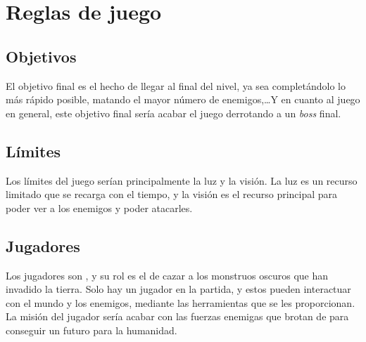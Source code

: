\section{Reglas de juego}
    \begin{multicols}{2}

        \subsection{Objetivos}
        El objetivo final es el hecho de llegar al final del nivel, ya sea completándolo lo más rápido posible, matando el mayor número de enemigos,\dots\space Y en cuanto al juego en general, este objetivo final sería acabar el juego derrotando a un \textit{boss} final.
        \subsection{Límites}
        Los límites del juego serían principalmente la luz y la visión. La luz es un recurso limitado que se recarga con el tiempo, y la visión es el recurso principal para poder ver a los enemigos y poder atacarles.

        \subsection{Jugadores}
        Los jugadores son \hunters, y su rol es el de cazar a los monstruos oscuros que han invadido la tierra. Solo hay un jugador en la partida, y estos pueden interactuar con el mundo y los enemigos, mediante las herramientas que se les proporcionan.
        La misión del jugador sería acabar con las fuerzas enemigas que brotan de \hole para conseguir un futuro para la humanidad.


\end{multicols}
